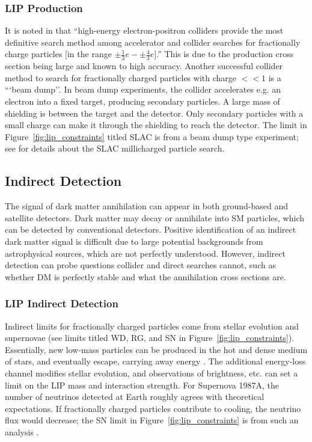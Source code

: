 \subsubsection{LIP Production}
It is noted in \cite{Perl2009} that ``high-energy electron-positron colliders provide the most definitive search method among accelerator and collider searches for fractionally charge particles [in the range $\pm\frac{1}{3}e -\pm \frac{4}{3}e$].'' This is due to the production cross section being large and known to high accuracy. Another successful collider method to search for fractionally charged particles with charge $<<1$ is a ```beam dump''. In beam dump experiments, the collider accelerates e.g. an electron into a fixed target, producing secondary particles. A large mass of shielding is between the target and the detector. Only secondary particles with a small charge can make it through the shielding to reach the detector. The limit in Figure~\ref{fig:lip_constraints} titled SLAC is from a beam dump type experiment; see \cite{Prinz1998} for details about the SLAC millicharged particle search.

\subsection{Indirect Detection}
The signal of dark matter annihilation can appear in both ground-based and satellite detectors. Dark matter may decay or annihilate into \ac{SM} particles, which can be detected by conventional detectors. Positive identification of an indirect dark matter signal is difficult due to large potential backgrounds from astrophysical sources, which are not perfectly understood. However, indirect detection can probe questions collider and direct searches cannot, such as whether \ac{DM} is perfectly stable and what the annihilation cross sections are. 

\subsubsection{LIP Indirect Detection}
Indirect limits for fractionally charged particles come from stellar evolution and supernovae (see limits titled WD, RG, and SN in Figure~\ref{fig:lip_constraints}). Essentially, new low-mass particles can be produced in the hot and dense medium of stars, and eventually escape, carrying away energy \cite{Davidson2000}. The additional energy-loss channel modifies stellar evolution, and observations of brightness, etc. can set a limit on the \ac{LIP} mass and interaction strength. For Supernova 1987A, the number of neutrinos detected at Earth roughly agrees with theoretical expectations. If fractionally charged particles contribute to cooling, the neutrino flux would decrease; the SN limit in Figure~\ref{fig:lip_constraints} is from such an analysis \cite{Perl2009} \cite{Davidson2000}.


